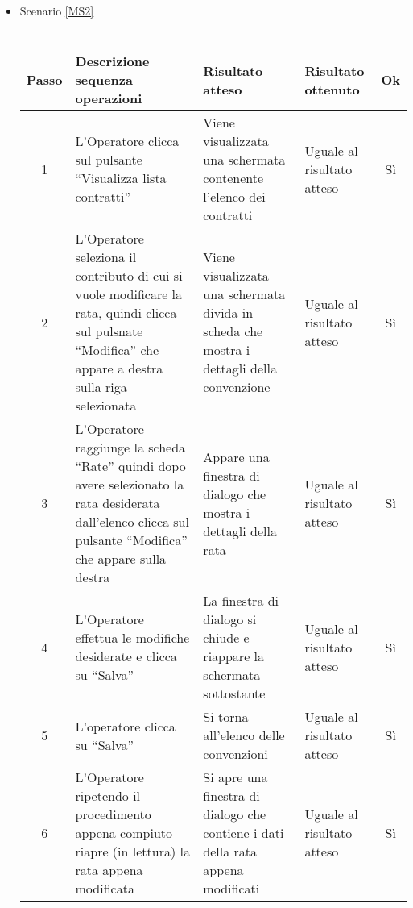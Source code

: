 \begin{itemize}
 \item Scenario \ref{MS2}\\\\
 {
 \footnotesize
  \begin{longtable}{|c|p{3cm}|p{3cm}|p{3cm}|c|}
    \hline
    Passo & Descrizione sequenza operazioni & Risultato atteso & Risultato ottenuto & Ok\\
    \hline
    1 & L'Operatore clicca sul pulsante ``Visualizza lista contratti'' & Viene visualizzata una schermata contenente l'elenco dei contratti & Uguale 
      al risultato atteso& Sì\\
    \hline
    2 & L'Operatore seleziona il contributo di cui si vuole modificare la rata, quindi clicca sul pulsnate ``Modifica'' che appare a destra sulla riga selezionata& Viene visualizzata una schermata divida in scheda che mostra i dettagli
    della convenzione& Uguale al risultato atteso & Sì\\
    \hline
    3 & L'Operatore raggiunge la scheda ``Rate'' quindi dopo avere selezionato la rata desiderata dall'elenco clicca sul pulsante ``Modifica'' che appare sulla destra& Appare una finestra di dialogo che mostra i dettagli della rata & Uguale al risultato atteso & Sì\\
    \hline
    4 & L'Operatore effettua le modifiche desiderate e clicca su ``Salva'' & La finestra di dialogo si chiude e riappare la schermata sottostante & Uguale al risultato atteso& Sì\\
    \hline
    5 & L'operatore clicca su ``Salva''& Si torna all'elenco delle convenzioni & Uguale al risultato atteso & Sì\\
    \hline
    6  & L'Operatore ripetendo il procedimento appena compiuto riapre (in lettura) la rata appena modificata & Si apre una finestra di dialogo che contiene i dati della rata appena modificati & Uguale al risultato atteso & Sì\\
    \hline
\end{longtable}
}



\end{itemize}
